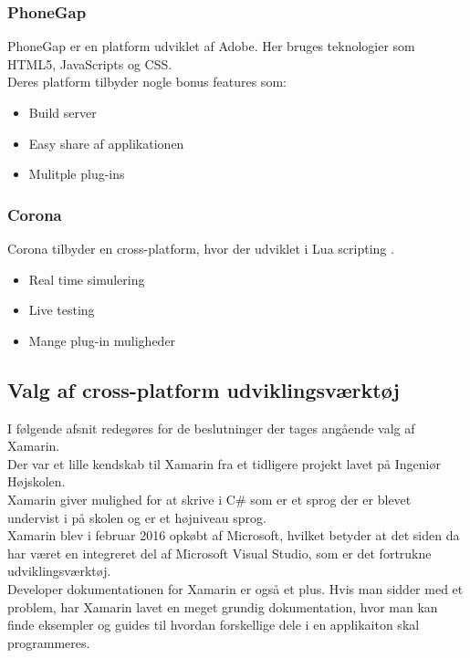 \subsubsection{PhoneGap}
PhoneGap\cite{PhoneGap} er en platform udviklet af Adobe\cite{Adobe}. Her bruges teknologier som HTML5\cite{HTML5}, JavaScripts\cite{JavaScript} og CSS\cite{CSS}. \\
Deres platform tilbyder nogle bonus features som:
\begin{itemize}[-]
	\item Build server
	\item Easy share af applikationen 
	\item Mulitple plug-ins
\end{itemize}

\clearpage

\subsubsection{Corona}
Corona\cite{Corona} tilbyder en cross-platform, hvor der udviklet i Lua scripting \cite{Lua}.
\begin{itemize}[-]
	\item Real time simulering
	\item Live testing
	\item Mange plug-in muligheder
\end{itemize}

\subsection{Valg af cross-platform udviklingsværktøj}
I følgende afsnit redegøres for de beslutninger der tages angående valg af Xamarin. \\

Der var et lille kendskab til Xamarin fra et tidligere projekt lavet på Ingeniør Højskolen. \\
Xamarin giver mulighed for at skrive i C\# som er et sprog der er blevet undervist i på skolen og er et højniveau sprog. \\
Xamarin blev i februar 2016 opkøbt af Microsoft, hvilket betyder at det siden da har været en integreret del af Microsoft Visual Studio, som er det fortrukne udviklingsværktøj.\\
Developer dokumentationen for Xamarin er også et plus. Hvis man sidder med et problem, har Xamarin lavet en meget grundig dokumentation, hvor man kan finde eksempler og guides til hvordan forskellige dele i en applikaiton skal programmeres.

